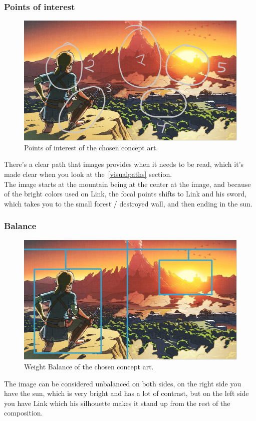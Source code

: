 \documentclass{cup-pan}
\begin{document}
            \subsubsection{Points of interest}
                \begin{figure}[H]
                    \includegraphics[width = \textwidth]{Imagenes/Referencias/Analisis_ConceptArt/puntos interes.png}
                    \caption{Points of interest of the chosen concept art.}
                \end{figure}
                There's a clear path that images provides when it needs to be read, which it's made clear when you look at the~\ref{visualpaths} section.\\

                The image starts at the mountain being at the center at the image, and because of the bright colors used on Link, the focal points shifts to Link and his sword, which takes you to the small forest / destroyed wall, and then ending in the sun.\\

            \subsubsection{Balance}
                \begin{figure}[H]
                    \includegraphics[width=\textwidth]{Imagenes/Referencias/Analisis_ConceptArt/balanza.png}
                    \caption{Weight Balance of the chosen concept art.}
                \end{figure}
                The image can be considered unbalanced on both sides, on the right side you have the sun, which is very bright and has a lot of contrast, but on the left side you have Link which his silhouette makes it stand up from the rest of the composition. 
        \newpage
\end{document}

